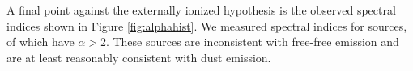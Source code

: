 \documentclass[twocolumn]{aastex61}
\begin{document}
A final point against the externally ionized hypothesis is the observed
spectral indices shown in Figure \ref{fig:alphahist}.  We measured spectral
indices for \nalphas sources, of which \ngttwo have $\alpha>2$.  These \ngttwo
sources are inconsistent with free-free emission and are at least reasonably
consistent with dust emission.



% 
% 


%
\end{document}
